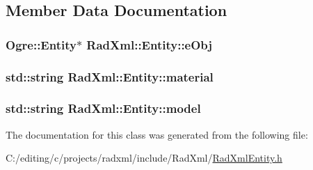 \subsection{Member Data Documentation}
\hypertarget{class_rad_xml_1_1_entity_a760858b73282dd9986fc4607fb4451a1}{
\subsubsection[{e\-Obj}]{\setlength{\rightskip}{0pt plus 5cm}Ogre\-::\-Entity$\ast$ Rad\-Xml\-::\-Entity\-::e\-Obj\hspace{0.3cm}{\ttfamily [protected]}}}\label{class_rad_xml_1_1_entity_a760858b73282dd9986fc4607fb4451a1}
\hypertarget{class_rad_xml_1_1_entity_af33c3220e26ac4d8913ea6d2676517f8}{
\subsubsection[{material}]{\setlength{\rightskip}{0pt plus 5cm}std\-::string Rad\-Xml\-::\-Entity\-::material\hspace{0.3cm}{\ttfamily [protected]}}}\label{class_rad_xml_1_1_entity_af33c3220e26ac4d8913ea6d2676517f8}
\hypertarget{class_rad_xml_1_1_entity_a0ca007b67fb84eb925ab943adfb468c3}{
\subsubsection[{model}]{\setlength{\rightskip}{0pt plus 5cm}std\-::string Rad\-Xml\-::\-Entity\-::model\hspace{0.3cm}{\ttfamily [protected]}}}\label{class_rad_xml_1_1_entity_a0ca007b67fb84eb925ab943adfb468c3}


The documentation for this class was generated from the following file\-:\begin{DoxyCompactItemize}
\item 
C\-:/editing/c/projects/radxml/include/\-Rad\-Xml/\hyperlink{_rad_xml_entity_8h}{Rad\-Xml\-Entity.\-h}\end{DoxyCompactItemize}

